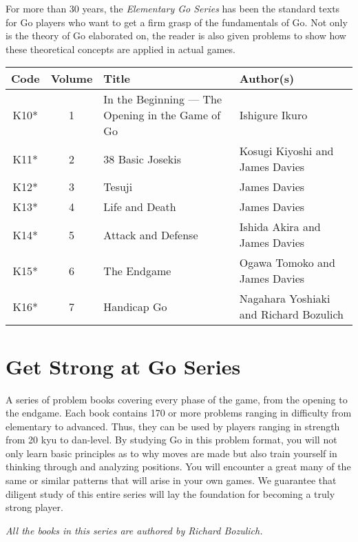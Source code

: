 For more than 30 years, the \emph{Elementary Go Series} has been the standard texts for Go players who want to get a firm grasp of the fundamentals of Go. Not only is the theory of Go elaborated on, the reader is also given problems to show how these theoretical concepts are applied in actual games.

\begin{longtable}{c|c|p{35mm}|p{35mm}} 
    \hline
    \textbf{Code} & \textbf{Volume} & \textbf{Title} &\textbf{Author(s)} \\
    \hline \hline
    K10* & 1 & In the Beginning --- The Opening in the Game of Go & Ishigure Ikuro \\
    \hline
    K11* & 2 & 38 Basic Josekis & Kosugi Kiyoshi and James Davies \\
    \hline
    K12* & 3 & Tesuji & James Davies \\
    \hline
    K13* & 4 & Life and Death & James Davies \\
    \hline
    K14* & 5 & Attack and Defense & Ishida Akira and James Davies \\
    \hline
    K15* & 6 & The Endgame & Ogawa Tomoko and James Davies \\
    \hline
    K16* & 7 & Handicap Go & Nagahara Yoshiaki and Richard Bozulich \\
    \hline
\end{longtable}

\section{Get Strong at Go Series}

A series of problem books covering every phase of the game, from the opening to the endgame. Each book contains 170 or more problems ranging in difficulty from elementary to advanced. Thus, they can be used by players ranging in strength from 20 kyu to dan-level. By studying Go in this problem format, you will not only learn basic principles as to why moves are made but also train yourself in thinking through and analyzing positions. You will encounter a great many of the same or similar patterns that will arise in your own games. We guarantee that diligent study of this entire series will lay the foundation for becoming a truly strong player.

\bigskip

\emph{All the books in this series are authored by Richard Bozulich.}

